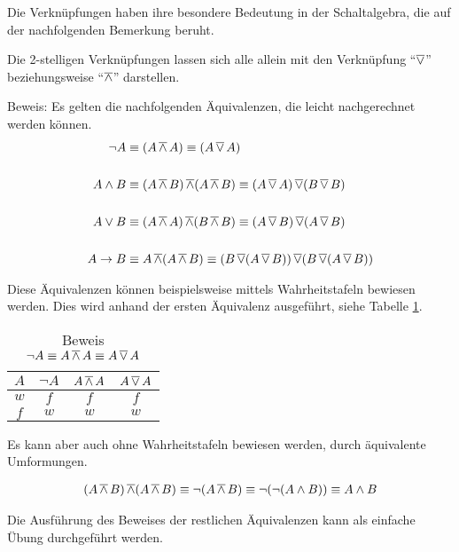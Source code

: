 \begin{Unit}[Bemerkung]
Die Verknüpfungen haben ihre besondere Bedeutung in der Schaltalgebra, die 
auf der nachfolgenden Bemerkung beruht.

\begin{Bemerkung}
Die 2-stelligen Verknüpfungen lassen sich alle allein mit den Verknüpfung 
\enquote{$\operatorname{\overline{\vee}}$} beziehungsweise \enquote{$\operatorname{\overline{\wedge}}$} darstellen.
\end{Bemerkung}

Beweis: Es gelten die nachfolgenden Äquivalenzen, die leicht nachgerechnet 
werden können. 
\begin{align}
  \neg A    &\equiv (A \operatorname{\overline{\wedge}} A) 
    \equiv (A \operatorname{\overline{\vee}} A) \\
    \nonumber \\
  A \land B &\equiv (A \operatorname{\overline{\wedge}} B) \operatorname{\overline{\wedge}} (A \operatorname{\overline{\wedge}} B) 
    \equiv (A \operatorname{\overline{\vee}} A) \operatorname{\overline{\vee}} (B \operatorname{\overline{\vee}} B) \\
    \nonumber \\
  A \lor B  &\equiv (A \operatorname{\overline{\wedge}} A) \operatorname{\overline{\wedge}} (B \operatorname{\overline{\wedge}} B) 
    \equiv (A \operatorname{\overline{\vee}} B) \operatorname{\overline{\vee}} (A \operatorname{\overline{\vee}} B) \\ 
    \nonumber \\
   A \rightarrow B &\equiv A \operatorname{\overline{\wedge}} (A \operatorname{\overline{\wedge}} B) 
     \equiv (B \operatorname{\overline{\vee}} (A \operatorname{\overline{\vee}} B)) \operatorname{\overline{\vee}} (B \operatorname{\overline{\vee}} (A \operatorname{\overline{\vee}} B))
\end{align}

Diese Äquivalenzen können beispielsweise mittels Wahrheitstafeln bewiesen 
werden. Dies wird anhand der ersten Äquivalenz ausgeführt, siehe Tabelle
\ref{tbl:Beweis not(A) = A nand A = A nor A}.
 
\begin{table}[htbp]
\begin{center}
\begin{tabular}{c||c|c|c}
  $A$ & $\neg A$ & $A \operatorname{\overline{\wedge}} A$ & $A \operatorname{\overline{\vee}} A$ \\ \hline
  $w$ & $f$      & $f$          & $f$       \\
  $f$ & $w$      & $w$          & $w$       \\
\end{tabular}
\caption{Beweis $\neg A \equiv A \operatorname{\overline{\wedge}} A \equiv A \operatorname{\overline{\vee}} A$}
\label{tbl:Beweis not(A) = A nand A = A nor A}
\end{center} 
\end{table}

Es kann aber auch ohne Wahrheitstafeln bewiesen werden, durch äquivalente
Umformungen.

\begin{align*}
  (A \operatorname{\overline{\wedge}} B) \operatorname{\overline{\wedge}} (A \operatorname{\overline{\wedge}} B) \equiv \neg (A \operatorname{\overline{\wedge}} B)
  \equiv \neg (\neg (A \land B)) \equiv A \land B
\end{align*}

Die Ausführung des Beweises der restlichen Äquivalenzen kann als einfache 
Übung durchgeführt werden.
\end{Unit}

